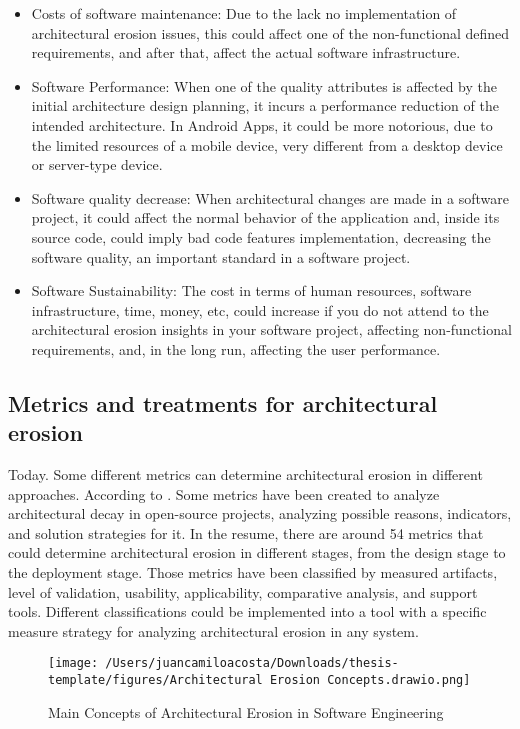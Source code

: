 \begin{itemize}
    \item Costs of software maintenance: Due to the lack no implementation of architectural erosion issues, this could affect one of the non-functional defined requirements, and after that, affect the actual software infrastructure.
    \item Software Performance: When one of the quality attributes is affected by the initial architecture design planning, it incurs a performance reduction of the intended architecture. In Android Apps, it could be more notorious, due to the limited resources of a mobile device, very different from a desktop device or server-type device.
    \item Software quality decrease: When architectural changes are made in a software project, it could affect the normal behavior of the application and, inside its source code, could imply bad code features implementation, decreasing the software quality, an important standard in a software project.
    \item Software Sustainability: The cost in terms of human resources, software infrastructure, time, money, etc, could increase if you do not attend to the architectural erosion insights in your software project, affecting non-functional requirements, and, in the long run, affecting the user performance.
\end{itemize}


\subsection{Metrics and treatments for architectural erosion}
Today. Some different metrics can determine architectural erosion in different approaches. According to \citet{ieee-erosion-metrics}. Some metrics have been created to analyze architectural decay in open-source projects, analyzing possible reasons, indicators, and solution strategies for it. In the resume, there are around 54 metrics that could determine architectural erosion in different stages, from the design stage to the deployment stage. Those metrics have been classified by measured artifacts, level of validation, usability, applicability, comparative analysis, and support tools. Different classifications could be implemented into a tool with a specific measure strategy for analyzing architectural erosion in any system.

\begin{figure}
    \centering
    \texttt{[image: /Users/juancamiloacosta/Downloads/thesis-template/figures/Architectural Erosion Concepts.drawio.png]}
    \caption{Main Concepts of Architectural Erosion in Software Engineering }
    \label{fig:concept-map}
\end{figure}

